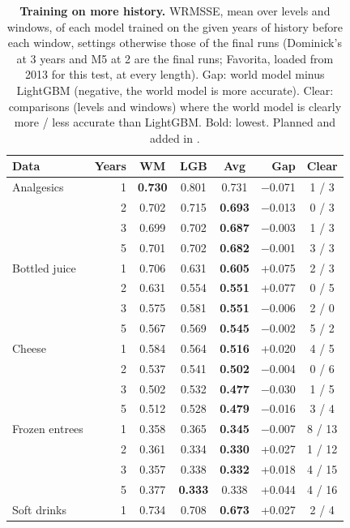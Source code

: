 \begin{table}[t]
\centering
\caption{\textbf{Training on more history.} WRMSSE, mean over levels and windows, of each model trained on the given
years of history before each window, settings otherwise those of the final runs (Dominick's at 3 years and M5 at 2 are
the final runs; Favorita, loaded from 2013 for this test, at every length). Gap: world model minus LightGBM (negative,
the world model is more accurate). Clear: comparisons (levels and windows) where the world model is clearly more / less
accurate than LightGBM. Bold: lowest. Planned and added in \thisrev{}.}
\label{tab:history}
\footnotesize\setlength{\tabcolsep}{3.5pt}
\begin{tabular}{lrcccrc}
\toprule
Data & Years & WM & LGB & Avg & Gap & Clear \\
\midrule
Analgesics & 1 & \textbf{0.730} & 0.801 & 0.731 & $-$0.071 & 1 / 3 \\
 & 2 & 0.702 & 0.715 & \textbf{0.693} & $-$0.013 & 0 / 3 \\
 & 3 & 0.699 & 0.702 & \textbf{0.687} & $-$0.003 & 1 / 3 \\
 & 5 & 0.701 & 0.702 & \textbf{0.682} & $-$0.001 & 3 / 3 \\
\addlinespace[2pt]
Bottled juice & 1 & 0.706 & 0.631 & \textbf{0.605} & +0.075 & 2 / 3 \\
 & 2 & 0.631 & 0.554 & \textbf{0.551} & +0.077 & 0 / 5 \\
 & 3 & 0.575 & 0.581 & \textbf{0.551} & $-$0.006 & 2 / 0 \\
 & 5 & 0.567 & 0.569 & \textbf{0.545} & $-$0.002 & 5 / 2 \\
\addlinespace[2pt]
Cheese & 1 & 0.584 & 0.564 & \textbf{0.516} & +0.020 & 4 / 5 \\
 & 2 & 0.537 & 0.541 & \textbf{0.502} & $-$0.004 & 0 / 6 \\
 & 3 & 0.502 & 0.532 & \textbf{0.477} & $-$0.030 & 1 / 5 \\
 & 5 & 0.512 & 0.528 & \textbf{0.479} & $-$0.016 & 3 / 4 \\
\addlinespace[2pt]
Frozen entrees & 1 & 0.358 & 0.365 & \textbf{0.345} & $-$0.007 & 8 / 13 \\
 & 2 & 0.361 & 0.334 & \textbf{0.330} & +0.027 & 1 / 12 \\
 & 3 & 0.357 & 0.338 & \textbf{0.332} & +0.018 & 4 / 15 \\
 & 5 & 0.377 & \textbf{0.333} & 0.338 & +0.044 & 4 / 16 \\
\addlinespace[2pt]
Soft drinks & 1 & 0.734 & 0.708 & \textbf{0.673} & +0.027 & 2 / 4 \\

\end{tabular}
\end{table}
